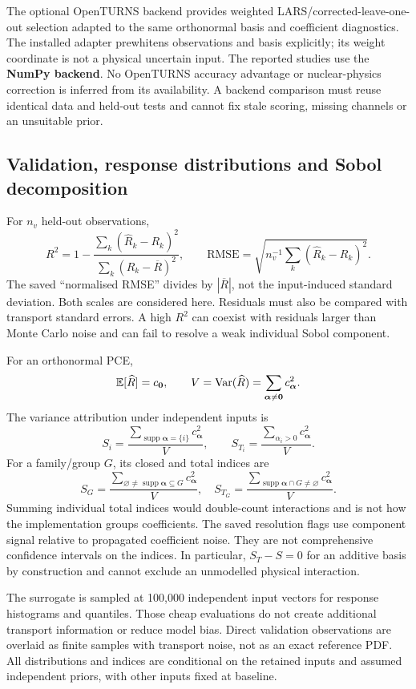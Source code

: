 The optional OpenTURNS backend \citep{openturns} provides weighted LARS/corrected-leave-one-out selection adapted to the same orthonormal basis and coefficient diagnostics. The installed adapter prewhitens observations and basis explicitly; its weight coordinate is not a physical uncertain input. The reported studies use the \textbf{NumPy backend}. No OpenTURNS accuracy advantage or nuclear-physics correction is inferred from its availability. A backend comparison must reuse identical data and held-out tests and cannot fix stale scoring, missing channels or an unsuitable prior.

\subsection{Validation, response distributions and Sobol decomposition}
For $n_v$ held-out observations,
\begin{equation}
R^2=1-\frac{\sum_k(\widehat R_k-R_k)^2}{\sum_k(R_k-\overline R)^2},\qquad
\mathrm{RMSE}=\sqrt{n_v^{-1}\sum_k(\widehat R_k-R_k)^2}.\label{eq:val}
\end{equation}
The saved ``normalised RMSE'' divides by $|\overline R|$, not the input-induced standard deviation. Both scales are considered here. Residuals must also be compared with transport standard errors. A high $R^2$ can coexist with residuals larger than Monte Carlo noise and can fail to resolve a weak individual Sobol component.

For an orthonormal PCE,
\begin{equation}
\mathbb{E}[\widehat R]=c_{\bm0},\qquad V=\operatorname{Var}(\widehat R)=\sum_{\bm\alpha\ne\bm0}c_{\bm\alpha}^2.\label{eq:pcevar}
\end{equation}
The variance attribution under independent inputs \citep{sobol,sudret} is
\begin{equation}
S_i=\frac{\sum_{\operatorname{supp}\bm\alpha=\{i\}}c_{\bm\alpha}^2}{V},\qquad
S_{T_i}=\frac{\sum_{\alpha_i>0}c_{\bm\alpha}^2}{V}.\label{eq:sobol}
\end{equation}
For a family/group $G$, its closed and total indices are
\begin{equation}
S_G=\frac{\sum_{\varnothing\ne\operatorname{supp}\bm\alpha\subseteq G}c_{\bm\alpha}^2}{V},\quad
S_{T_G}=\frac{\sum_{\operatorname{supp}\bm\alpha\cap G\ne\varnothing}c_{\bm\alpha}^2}{V}.\label{eq:groups}
\end{equation}
Summing individual total indices would double-count interactions and is not how the implementation groups coefficients. The saved resolution flags use component signal relative to propagated coefficient noise. They are not comprehensive confidence intervals on the indices. In particular, $S_T-S=0$ for an additive basis by construction and cannot exclude an unmodelled physical interaction.

The surrogate is sampled at 100,000 independent input vectors for response histograms and quantiles. Those cheap evaluations do not create additional transport information or reduce model bias. Direct validation observations are overlaid as finite samples with transport noise, not as an exact reference PDF. All distributions and indices are conditional on the retained inputs and assumed independent priors, with other inputs fixed at baseline.
